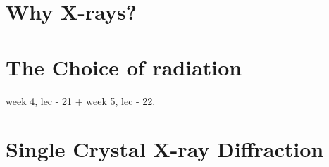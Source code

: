 \documentclass[11pt,a4paper]{article}
\begin{document}
	\section{Why X-rays?}
	
		
	
	
	
	
	
	
	\section{The Choice of radiation}
	
	week 4, lec - 21 + week 5, lec - 22.
	
	
	
	\section{Single Crystal X-ray Diffraction}
	
	
	
	

	
	
	
	
	
	
	
		
\end{document}
